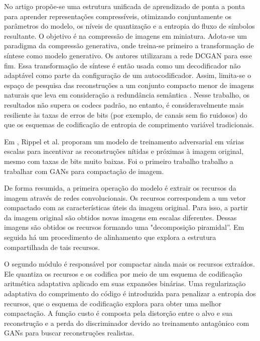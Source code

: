 


No artigo \cite{santurkar2018generative} propõe-se uma estrutura unificada de aprendizado de ponta a ponta para aprender representações compressíveis, otimizando conjuntamente os parâmetros do modelo, os níveis de quantização e a entropia do fluxo de símbolos resultante. O objetivo é na compressão de imagens em miniatura.
Adota-se um paradigma da compressão generativa, onde treina-se primeiro a transformação de síntese como modelo generativo. Os autores utilizaram a rede DCGAN \cite{radford2015unsupervised} para esse fim. Essa transformação de síntese é então usada como um decodificador não adaptável como parte da configuração de um autocodificador. Assim, limita-se o espaço de pesquisa das reconstruções a um conjunto compacto menor de imagens naturais que leva em consideração a redundância semântica \cite{santurkar2018generative}. 
Nesse trabalho, os resultados não supera os codecs padrão, no entanto, é consideravelmente mais resiliente às taxas de erros de bits (por exemplo, de canais sem fio ruidosos) do que os esquemas de codificação de entropia de comprimento variável tradicionais.



Em \cite{GAN2017Rippel}, Rippel et al. proporam um modelo de treinamento adversarial em várias escalas para incentivar as reconstruções nítidas e próximas à imagem original, mesmo com taxas de bits muito baixas. Foi o primeiro trabalho trabalho a trabalhar com GANs para compactação de imagem. 

De forma resumida, a primeira operação do modelo é extrair os recursos da imagem através de redes convolucionais. Os recursos correspondem a um vetor compactado com as características úteis da imagem original. Para isso, a partir da imagem original são obtidos novas imagens em escalas diferentes. Dessas imagens são obtidos os recursos formando uma  "decomposição piramidal''. Em seguida há um procedimento de alinhamento que explora a estrutura compartilhada de tais recursos.  

O segundo módulo é responsável por compactar ainda mais os recursos extraídos. Ele quantiza os recursos e os codifica por meio de um esquema de codificação aritmética adaptativa aplicado em suas expansões binárias. Uma regularização adaptativa do comprimento do código é introduzida para penalizar a entropia dos recursos, que o esquema de codificação explora para obter uma melhor compactação. 
A função custo é composta pela distorção entre o alvo e sua reconstrução e a perda do discriminador devido ao treinamento antagônico com GANs para buscar reconstruções realistas.


